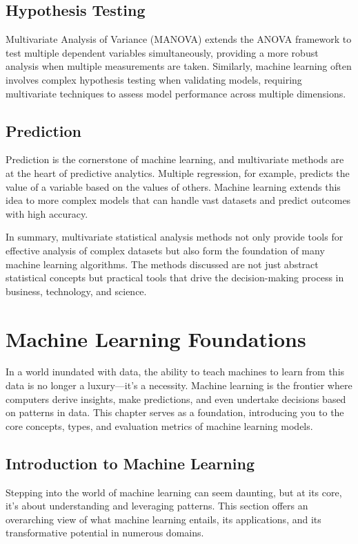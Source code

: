 \documentclass{book}
\begin{document}
\section{Hypothesis Testing}
Multivariate Analysis of Variance (MANOVA) extends the ANOVA framework to test multiple dependent variables simultaneously, providing a more robust analysis when multiple measurements are taken. Similarly, machine learning often involves complex hypothesis testing when validating models, requiring multivariate techniques to assess model performance across multiple dimensions.

\section{Prediction}
Prediction is the cornerstone of machine learning, and multivariate methods are at the heart of predictive analytics. Multiple regression, for example, predicts the value of a variable based on the values of others. Machine learning extends this idea to more complex models that can handle vast datasets and predict outcomes with high accuracy.

In summary, multivariate statistical analysis methods not only provide tools for effective analysis of complex datasets but also form the foundation of many machine learning algorithms. The methods discussed are not just abstract statistical concepts but practical tools that drive the decision-making process in business, technology, and science.


\chapter{Machine Learning Foundations}
In a world inundated with data, the ability to teach machines to learn from this data is no longer a luxury—it's a necessity. Machine learning is the frontier where computers derive insights, make predictions, and even undertake decisions based on patterns in data. This chapter serves as a foundation, introducing you to the core concepts, types, and evaluation metrics of machine learning models.

\section{Introduction to Machine Learning}
Stepping into the world of machine learning can seem daunting, but at its core, it's about understanding and leveraging patterns. This section offers an overarching view of what machine learning entails, its applications, and its transformative potential in numerous domains.
\end{document}
